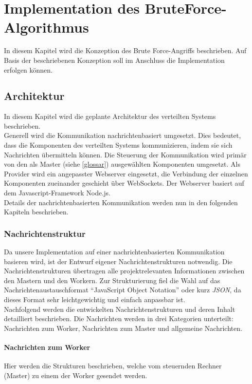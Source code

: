 \chapter{Implementation des BruteForce-Algorithmus}
\label{implementation}
In diesem Kapitel wird die Konzeption des Brute Force-Angriffs beschrieben. Auf Basis der beschriebenen Konzeption soll im Anschluss die Implementation erfolgen können. 



\section{Architektur}
In diesem Kapitel wird die geplante Architektur des verteilten Systems beschrieben. \\
Generell wird die Kommunikation nachrichtenbasiert umgesetzt. Dies bedeutet, dass die Komponenten des verteilten Systems kommunizieren, indem sie sich Nachrichten übermitteln können. Die Steuerung der Kommunikation wird primär von den als Master 
(siehe \ref{glossar}) ausgewählten Komponenten umgesetzt. Als Provider wird ein angepasster Webserver eingesetzt, die Verbindung der einzelnen Komponenten zueinander geschieht über WebSockets. Der Webserver basiert auf dem Javascript-Framework Node.js. \\
Details der nachrichtenbasierten Kommunikation werden nun in den folgenden Kapiteln beschrieben. 


\subsection{Nachrichtenstruktur}
Da unsere Implementation auf einer nachrichtenbasierten Kommunikation basieren wird, ist der Entwurf eigener Nachrichtenstrukturen notwendig. Die Nachrichtenstrukturen übertragen alle projektrelevanten Informationen zwischen den Mastern und den Workern. Zur Strukturierung fiel die Wahl auf das Nachrichtenaustauschformat \enquote{JavaScript Object Notation} oder kurz \emph{JSON}, da dieses Format sehr leichtgewichtig und einfach anpassbar ist. \\
Nachfolgend werden die entwickelten Nachrichtenstrukturen und deren Inhalt detailliert beschrieben. Die Nachrichten werden in drei Kategorien unterteilt: Nachrichten zum Worker, Nachrichten zum Master und allgemeine Nachrichten.

\subsubsection{Nachrichten zum Worker}
Hier werden die Strukturen beschrieben, welche vom steuernden Rechner (Master) zu einem der Worker gesendet werden.\\

